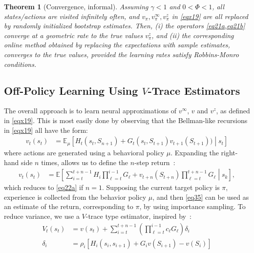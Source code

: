 \documentclass[letterpaper]{article} %
\newcommand{\EE}{\mathbb{E}}
\newtheorem{theorem}{Theorem}%
\begin{document}
	\begin{theorem}[Convergence, informal]	\label{T1}
		Assuming $\gamma<1$ and $0<\Phi<1$, all states/actions are visited infinitely often, and $v_\pi, v^\infty_\pi, v^z_\pi$ in \cref{eqx19} are all replaced by randomly initialized bootstrap estimates. Then, (i) the operators \cref{eq21a,eq21b} converge at a geometric rate to the true values $v^z_\pi$, and (ii) the corresponding online method obtained by replacing the expectations with sample estimates, converges to the true values, provided the learning rates satisfy Robbins-Monro conditions.
	\end{theorem}


	\subsection{Off-Policy Learning Using $V$-Trace Estimators}
	The overall approach is to learn neural approximations of $v^\infty$, $v$ and $v^z$, as defined in \cref{eqx19}. This is most easily done by observing that the Bellman-like recursions in \cref{eqx19} all have the form:
	\begin{align}
		v_t(s_t) & =\EE_\mu\left[H_t(s_t,S_{n+1})  + G_t(s_t, S_{t+1}) v_{t+1}(S_{t+1} )  )  \middle| s_t\right] \label{eq22a}
	\end{align}
	where actions are generated using a behavioral policy $\mu$. %
	Expanding the right-hand side $n$ times, allows us to define the $n$-step return~\cite{espeholt2018impala}:
	\begin{align}
		v_t(s_t) & =\EE\left[ \sum_{i=t}^{t+n-1} H_i \prod_{\ell=t}^{i-1} G_\ell + v_{t+n}(S_{t+n})  \prod_{\ell = t}^{ t+n-1} G_\ell   \middle| s_k\right], \label{eq35}
	\end{align}
	which reduces to \cref{eq22a} if $n=1$. Supposing the current target policy is $\pi$, experience is collected from the behavior policy $\mu$, and then \cref{eq35} can be used as an estimate of the return, corresponding to $\pi$, by using importance sampling. To reduce variance, we use a $V$-trace type estimator, inspired by~\citet{espeholt2018impala}:
	\begin{subequations}
		\begin{align}
			V_t(s_t) &= v(s_t) + \sum_{i=t}^{t+n-1} \left( \prod_{\ell=t}^{i-1} c_\ell G_{\ell} \right)	\delta_i \label{eq24a} \\
			\delta_i & = \rho_i \left[ H_i(s_i, s_{i+1}) + G_i v(S_{i+1})- v(S_i) \right]
		\end{align} \label{eq22}
	\end{subequations}
\end{document}
